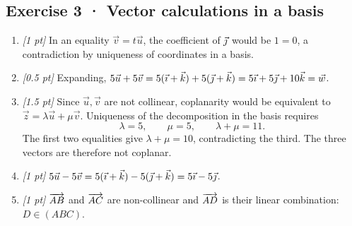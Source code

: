 \subsection*{Exercise 3 · Vector calculations in a basis}\begin{enumerate}

\item \textit{[1 pt]} In an equality $\vec v=t\vec u$, the coefficient of $\vec{\jmath} $ would be $1=0$, a contradiction by uniqueness of coordinates in a basis.

\item \textit{[0.5 pt]} Expanding, $5\vec u+5\vec v=5(\vec{\imath} +\vec k)+5(\vec{\jmath} +\vec k)=5\vec{\imath} +5\vec{\jmath} +10\vec k=\vec w$.

\item \textit{[1.5 pt]} Since $\vec u,\vec v$ are not collinear, coplanarity would be equivalent to $\vec z=\lambda\vec u+\mu\vec v$. Uniqueness of the decomposition in the basis requires
\[\lambda=5,\qquad\mu=5,\qquad\lambda+\mu=11.\]
The first two equalities give $\lambda+\mu=10$, contradicting the third. The three vectors are therefore not coplanar.

\item \textit{[1 pt]} $5\vec u-5\vec v=5(\vec{\imath} +\vec k)-5(\vec{\jmath} +\vec k)=5\vec{\imath} -5\vec{\jmath} $.

\item \textit{[1 pt]} $\overrightarrow{AB}$ and $\overrightarrow{AC}$ are non-collinear and $\overrightarrow{AD}$ is their linear combination: $D\in(ABC)$.

\end{enumerate}


